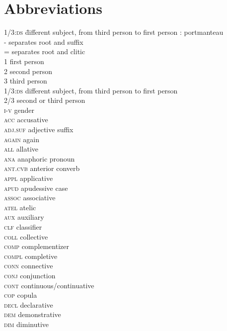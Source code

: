 \documentclass[output=paper]{LSP/langsci}
\begin{document}
\section*{Abbreviations}
\begin{tabbing}
\textsc{1/3:ds}  \= different subject, from third person to first person\kill
\textsc{:} \> portmanteau \\
\textsc{-} \> separates root and suffix \\
\textsc{=} \> separates root and clitic \\
\textsc{1} \> first person \\
\textsc{2} \> second person \\
\textsc{3}  \> third person \\
\textsc{1/3:ds}  \> different subject, from third person to first person\\
\textsc{2/3}  \> second or third person \\
\textsc{i-v} \> gender \\
\textsc{acc} \> accusative \\
\textsc{adj.suf} \> adjective suffix \\
\textsc{again} \> again \\
\textsc{all} \> allative \\
\textsc{ana} \> anaphoric pronoun \\
\textsc{ant.cvb} \> anterior converb \\
\textsc{appl} \> applicative \\
\textsc{apud} \> apudessive case \\
\textsc{assoc} \> associative \\
\textsc{atel} \> atelic \\
\textsc{aux} \> auxiliary \\
\textsc{clf} \> classifier \\
\textsc{coll} \> collective \\
\textsc{comp} \> complementizer \\
\textsc{compl} \> completive \\
\textsc{conn} \> connective \\
\textsc{conj} \> conjunction \\
\textsc{cont} \> continuous/continuative \\
\textsc{cop}  \> copula \\
\textsc{decl} \> declarative \\
\textsc{dem} \> demonstrative \\
\textsc{dim} \> diminutive \\

\end{tabbing}
\end{document}
